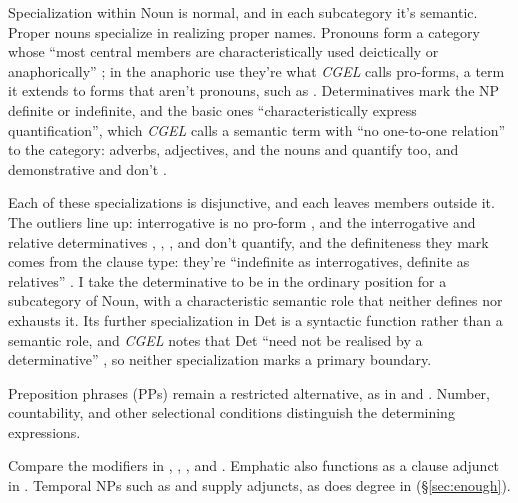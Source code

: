 \documentclass[12pt]{article}
\begin{document}
Specialization within Noun is normal, and in each subcategory it's semantic. Proper nouns specialize in realizing proper names. Pronouns form a category whose \enquote{most central members are characteristically used deictically or anaphorically} \citep[425]{huddleston2002}; in the anaphoric use they're what \textit{CGEL} calls pro-forms, a term it extends to forms that aren't pronouns, such as  \citep[68]{huddleston2002}. Determinatives mark the NP definite or indefinite, and the basic ones \enquote{characteristically express quantification}, which \textit{CGEL} calls a semantic term with \enquote{no one-to-one relation} to the category: adverbs, adjectives, and the nouns  and  quantify too, and demonstrative  and  don't \citep[358]{huddleston2002}.

Each of these specializations is disjunctive, and each leaves members outside it. The outliers line up: interrogative  is no pro-form \citep[1462]{huddleston2002}, and the interrogative and relative determinatives , , , and  \citep[356]{huddleston2002} don't quantify, and the definiteness they mark comes from the clause type: they're \enquote{indefinite as interrogatives, definite as relatives} \citep[357]{huddleston2002}. I take the determinative to be in the ordinary position for a subcategory of Noun, with a characteristic semantic role that neither defines nor exhausts it. Its further specialization in Det is a syntactic function rather than a semantic role, and \textit{CGEL} notes that Det \enquote{need not be realised by a determinative} \citep[358]{huddleston2002}, so neither specialization marks a primary boundary.

Preposition phrases (PPs) remain a restricted alternative, as in  and  \citep[357, 433]{huddleston2002}. Number, countability, and other selectional conditions distinguish the determining expressions.

Compare the modifiers in , , , and . Emphatic  also functions as a clause adjunct in  \citep[1496--1497]{huddleston2002}. Temporal NPs such as  and  supply adjuncts, as does degree  in  (§\ref{sec:enough}).
\end{document}
